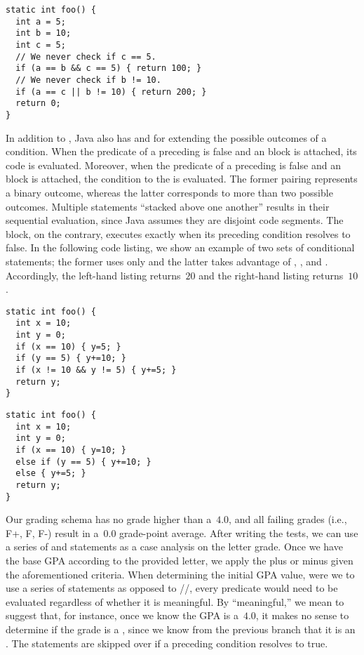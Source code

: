 \begin{lstlisting}[language=MyJava]
static int foo() {
  int a = 5;
  int b = 10;
  int c = 5;
  // We never check if c == 5.
  if (a == b && c == 5) { return 100; }
  // We never check if b != 10.
  if (a == c || b != 10) { return 200; }
  return 0;
}
\end{lstlisting}

In addition to , Java also has  and  for extending the possible outcomes of a condition. 
When the predicate of a preceding  is false and an  block is attached, its code is evaluated. 
Moreover, when the predicate of a preceding  is false and an  block is attached, the condition to the  is evaluated. 
The former pairing represents a binary outcome, whereas the latter corresponds to more than two possible outcomes. 
Multiple  statements ``stacked above one another'' results in their sequential evaluation, since Java assumes they are disjoint code segments. 
The  block, on the contrary, executes exactly when its preceding  condition resolves to false. 
In the following code listing, we show an example of two sets of conditional statements; the former uses only  and the latter takes advantage of , , and . 
Accordingly, the left-hand listing returns~$20$ and the right-hand listing returns~$10$.

\begin{clrr}[]{}
\begin{lstlisting}[language=MyJava]
static int foo() {
  int x = 10;
  int y = 0;
  if (x == 10) { y=5; } 
  if (y == 5) { y+=10; }
  if (x != 10 && y != 5) { y+=5; }
  return y;
}
\end{lstlisting}
\tcblower
\begin{lstlisting}[language=MyJava]
static int foo() {
  int x = 10;
  int y = 0;
  if (x == 10) { y=10; } 
  else if (y == 5) { y+=10; } 
  else { y+=5; }
  return y;
}
\end{lstlisting}
\end{clrr}

Our grading schema has no grade higher than a~$4.0$, and all failing grades (i.e., F+, F, F-) result in a~$0.0$ grade-point average. 
After writing the tests, we can use a series of  and  statements as a case analysis on the letter grade. 
Once we have the base GPA according to the provided letter, we apply the plus or minus given the aforementioned criteria. 
When determining the initial GPA value, were we to use a series of  statements as opposed to //, every predicate would need to be evaluated regardless of whether it is meaningful. 
By ``meaningful,'' we mean to suggest that, for instance, once we know the GPA is a~$4.0$, it makes no sense to determine if the grade is a , since we know from the previous branch that it is an . 
The  statements are skipped over if a preceding condition resolves to true.

